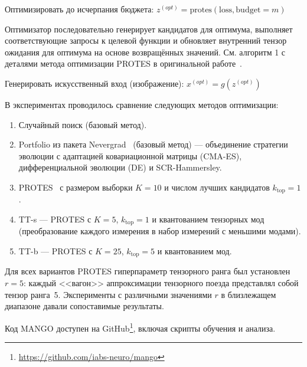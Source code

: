\begin{algorithm}[H]
\caption{Построение MEI с использованием PROTES}\label{alg:mango}
\footnotesize
{}


Оптимизировать до исчерпания бюджета:
$
z^{(opt)} =
    \mathrm{protes}(\mathrm{loss}, \mathrm{budget}=m)
$

Оптимизатор последовательно генерирует кандидатов для оптимума, выполняет соответствующие запросы к целевой функции и обновляет внутренний тензор ожидания для оптимума на основе возвращённых значений. См. алгоритм 1 с деталями метода оптимизации PROTES в оригинальной работе~\cite{PROTES-Chertkov-paper}.

Генерировать искусственный вход (изображение):
$
x^{(opt)} = g(z^{(opt)})
$


\end{algorithm}

В экспериментах проводилось сравнение следующих методов оптимизации:
\begin{enumerate}
    \itemsep0em
    \item Случайный поиск (базовый метод).
    \item Portfolio из пакета Nevergrad~\cite{Nevergrad} (базовый метод) --- объединение стратегии эволюции с адаптацией ковариационной матрицы (CMA-ES), дифференциальной эволюции (DE) и SCR-Hammersley.
    \item PROTES~\cite{PROTES-Chertkov-paper} с размером выборки $K=10$ и числом лучших кандидатов $k_\mathrm{top}=1$.
    \item TT-s --- PROTES с $K=5$, $k_\mathrm{top}=1$ и квантованием тензорных мод (преобразование каждого измерения в набор измерений с меньшими модами).
    \item TT-b --- PROTES с $K=25$, $k_\mathrm{top}=5$ и квантованием мод.
\end{enumerate}
Для всех вариантов PROTES гиперпараметр тензорного ранга был установлен $r = 5$: каждый <<вагон>> аппроксимации тензорного поезда представлял собой тензор ранга~5. Эксперименты с различными значениями $r$ в близлежащем диапазоне давали сопоставимые результаты.

Код MANGO доступен на GitHub\footnote{\url{https://github.com/iabs-neuro/mango}}, включая скрипты обучения и анализа.

